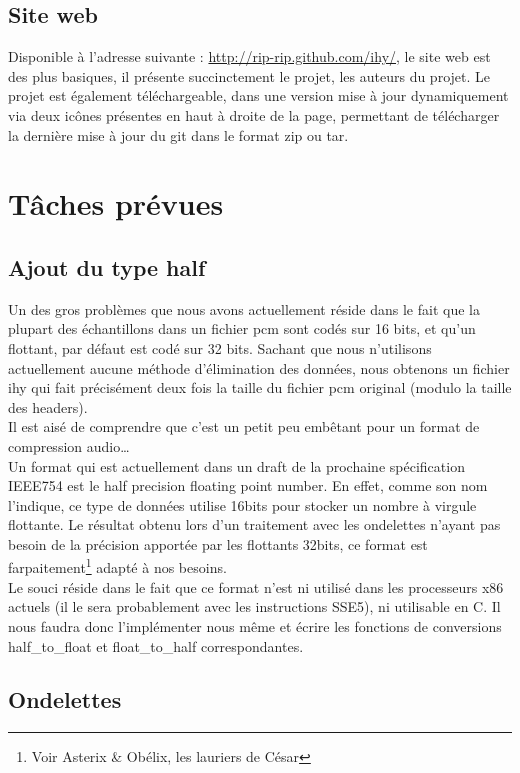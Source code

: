 \documentclass[a4paper,12pt]{article}
\begin{document}
	\subsection{Site web}
Disponible à l'adresse suivante : \url{http://rip-rip.github.com/ihy/}, le site
web est des plus basiques, il présente succinctement le projet, les auteurs du
projet. Le projet est également téléchargeable, dans une version mise à jour
dynamiquement via deux icônes présentes en haut à droite de la page, permettant
de télécharger la dernière mise à jour du git dans le format zip ou tar.

\section{Tâches prévues}

	\subsection{Ajout du type half}
Un des gros problèmes que nous avons actuellement réside dans le fait que la
plupart des échantillons dans un fichier pcm sont codés sur 16 bits, et qu'un
flottant, par défaut est codé sur 32 bits. Sachant que nous n'utilisons
actuellement aucune méthode d'élimination des données, nous obtenons un
fichier ihy qui fait précisément deux fois la taille du fichier pcm original
(modulo la taille des headers).\\
Il est aisé de comprendre que c'est un petit peu embêtant pour un format de
compression audio\ldots\\
Un format qui est actuellement dans un draft de la prochaine spécification
IEEE754 est le half precision floating point number. En effet, comme son nom
l'indique, ce type de données utilise 16bits pour stocker un nombre à virgule
flottante. Le résultat obtenu lors d'un traitement avec les ondelettes n'ayant
pas besoin de la précision apportée par les flottants 32bits, ce format est
farpaitement\footnote{Voir Asterix \& Obélix, les lauriers de César} adapté à nos
besoins.\\
Le souci réside dans le fait que ce format n'est ni utilisé dans les processeurs
x86 actuels (il le sera probablement avec les instructions SSE5), ni utilisable
en C. Il nous faudra donc l'implémenter nous même et écrire les fonctions de
conversions half\_to\_float et float\_to\_half correspondantes.

	\subsection{Ondelettes}
\end{document}
